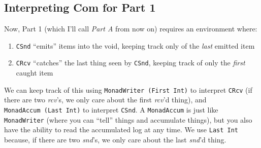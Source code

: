 \documentclass[]{article}
\newenvironment{Shaded}{}{}
\newcommand{\KeywordTok}[1]{\textcolor[rgb]{0.00,0.44,0.13}{\textbf{#1}}}
\newcommand{\DataTypeTok}[1]{\textcolor[rgb]{0.56,0.13,0.00}{#1}}
\newcommand{\DecValTok}[1]{\textcolor[rgb]{0.25,0.63,0.44}{#1}}
\newcommand{\CommentTok}[1]{\textcolor[rgb]{0.38,0.63,0.69}{\textit{#1}}}
\newcommand{\OtherTok}[1]{\textcolor[rgb]{0.00,0.44,0.13}{#1}}
\newcommand{\FunctionTok}[1]{\textcolor[rgb]{0.02,0.16,0.49}{#1}}
\newcommand{\NormalTok}[1]{#1}
\begin{document}
\subsection{Interpreting Com for Part 1}\label{interpreting-com-for-part-1}

Now, Part 1 (which I'll call \emph{Part A} from now on) requires an environment
where:

\begin{enumerate}
\def\labelenumi{\arabic{enumi}.}
\tightlist
\item
  \texttt{CSnd} ``emits'' items into the void, keeping track only of the
  \emph{last} emitted item
\item
  \texttt{CRcv} ``catches'' the last thing seen by \texttt{CSnd}, keeping track
  of only the \emph{first} caught item
\end{enumerate}

We can keep track of this using \texttt{MonadWriter\ (First\ Int)} to interpret
\texttt{CRcv} (if there are two \emph{rcv}'s, we only care about the first
\emph{rcv}'d thing), and \texttt{MonadAccum\ (Last\ Int)} to interpret
\texttt{CSnd}. A \texttt{MonadAccum} is just like \texttt{MonadWriter} (where
you can ``tell'' things and accumulate things), but you also have the ability to
read the accumulated log at any time. We use \texttt{Last\ Int} because, if
there are two \emph{snd}'s, we only care about the last \emph{snd}'d thing.

\begin{Shaded}
\end{Shaded}
\end{document}
